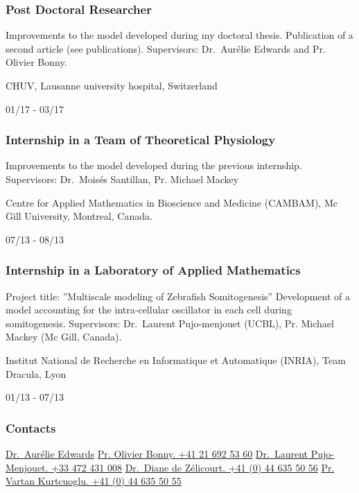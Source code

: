\documentclass[
]{article}
\begin{document}
\hypertarget{post-doctoral-researcher-1}{%
\subsubsection{Post Doctoral
Researcher}\label{post-doctoral-researcher-1}}

Improvements to the model developed during my doctoral thesis.
Publication of a second article (see publications). Supervisors:
Dr.~Aurélie Edwards and Pr. Olivier Bonny.

CHUV, Lausanne university hospital, Switzerland

01/17 - 03/17

\hypertarget{internship-in-a-team-of-theoretical-physiology}{%
\subsubsection{Internship in a Team of Theoretical
Physiology}\label{internship-in-a-team-of-theoretical-physiology}}

Improvements to the model developed during the previous internship.
Supervisors: Dr.~Moisés Santillan, Pr. Michael Mackey

Centre for Applied Mathematics in Bioscience and Medicine (CAMBAM), Mc
Gill University, Montreal, Canada.

07/13 - 08/13

\hypertarget{internship-in-a-laboratory-of-applied-mathematics}{%
\subsubsection{Internship in a Laboratory of Applied
Mathematics}\label{internship-in-a-laboratory-of-applied-mathematics}}

Project title: ''Multiscale modeling of Zebrafish Somitogenesis''
Development of a model accounting for the intra-cellular oscillator in
each cell during somitogenesis. Supervisors: Dr.~Laurent Pujo-menjouet
(UCBL), Pr. Michael Mackey (Mc Gill, Canada).

Institut National de Recherche en Informatique et Automatique (INRIA),
Team Dracula, Lyon

01/13 - 07/13

\hypertarget{references}{%
\subsubsection{Contacts}\label{references}}

\href{mailto:aued@bu.edu}{Dr.~Aurélie Edwards}
\href{mailto:olivier.bonny@unil.ch}{Pr. Olivier Bonny. +41 21 692 53 60}
\href{mailto:pujo@math.univ-lyon1.fr}{Dr.~Laurent Pujo-Menjouet. +33 472
431 008} \href{mailto:diane.dezelicourt@physiol.uzh.ch}{Dr.~Diane de
Zélicourt. +41 (0) 44 635 50 56}
\href{mailto:vartan.kurtcuoglu@uzh.ch}{Pr. Vartan Kurtcuoglu. +41 (0) 44
635 50 55}
\end{document}
